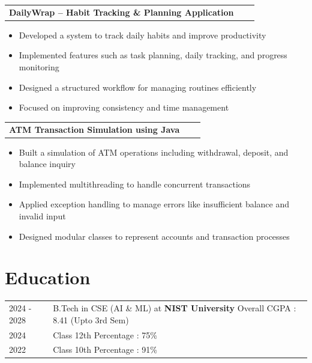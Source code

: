 \documentclass[a4paper,12pt]{article}
\makeatletter
\newenvironment{joblong}[2]
    {
    \begin{tabularx}{\linewidth}{@{}l X r@{}}
    \textbf{#1} & \hfill &  #2 \\[3.75pt]
    \end{tabularx}
    \begin{minipage}[t]{\linewidth}
    \begin{itemize}[nosep,after=\strut, leftmargin=1em, itemsep=3pt,label=--]
    }
    {
    \end{itemize}
    \end{minipage}    
    }
\makeatother
\begin{document}
\begin{joblong}{DailyWrap -- Habit Tracking \& Planning Application}{}
\item Developed a system to track daily habits and improve productivity
\item Implemented features such as task planning, daily tracking, and progress monitoring
\item Designed a structured workflow for managing routines efficiently
\item Focused on improving consistency and time management
\end{joblong}

\begin{joblong}{ATM Transaction Simulation using Java}{}
\item Built a simulation of ATM operations including withdrawal, deposit, and balance inquiry
\item Implemented multithreading to handle concurrent transactions
\item Applied exception handling to manage errors like insufficient balance and invalid input
\item Designed modular classes to represent accounts and transaction processes
\end{joblong}


\section{Education}
\begin{tabularx}{\linewidth}{@{}l X@{}}	

2024 - 2028 & B.Tech in CSE (AI \& ML) at \textbf{NIST University} \newline Overall CGPA : 8.41 (Upto 3rd Sem) \\

2024 & Class 12th \newline Percentage : 75\% \\

2022 & Class 10th \newline Percentage : 91\% \\

\end{tabularx}

\end{document}
